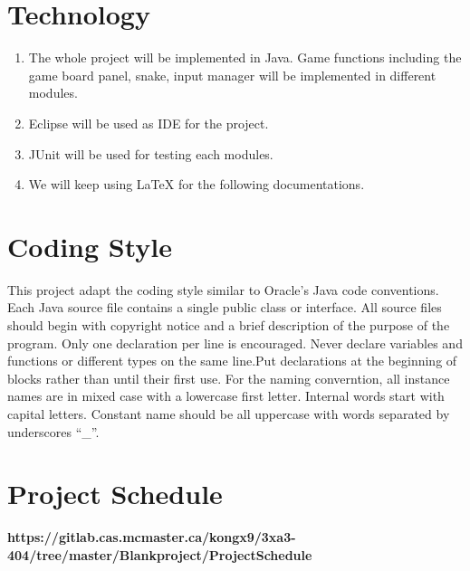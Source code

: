 \documentclass{article}
\begin{document}
\section{Technology}
    \begin{enumerate}
        \item The whole project will be implemented in Java. Game functions including the game board panel, snake, input manager will be implemented in different modules.
        \item Eclipse will be used as IDE for the project.
        \item JUnit will be used for testing each modules.
        \item We will keep using LaTeX for the following documentations.
    \end{enumerate}
\section{Coding Style}
This project adapt the coding style similar to Oracle's Java code conventions. Each Java source file contains a single public class or interface. All source files should begin with copyright notice and a brief description of the purpose of the program. Only one declaration per line is encouraged. Never declare variables and functions or different types on the same line.Put declarations at the beginning of blocks rather than until their first use. For the naming converntion, all instance names are in mixed case with a lowercase first letter. Internal words start with capital letters. Constant name should be all uppercase with words separated by underscores “\_”.
\section{Project Schedule}

\textbf{https://gitlab.cas.mcmaster.ca/kongx9/3xa3-404/tree/master/Blankproject/ProjectSchedule}
\end{document}
